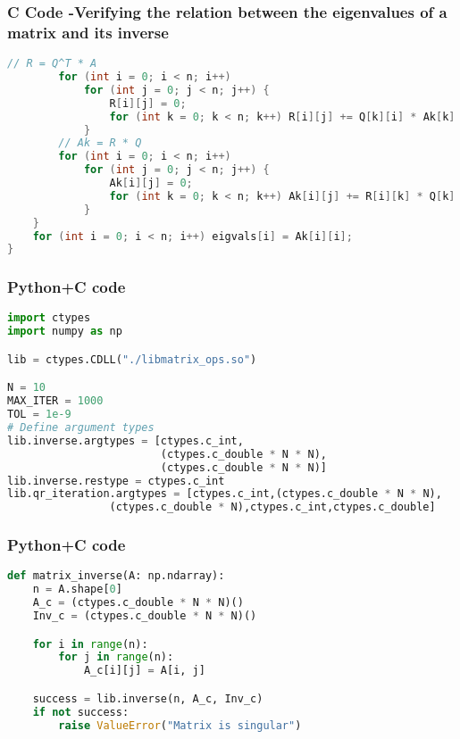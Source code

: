 \documentclass{beamer}
\begin{document}
\begin{frame}[fragile]
    \frametitle{C Code -Verifying the relation between the eigenvalues of a matrix and its inverse}

    \begin{lstlisting}[language=C]
  // R = Q^T * A
        for (int i = 0; i < n; i++)
            for (int j = 0; j < n; j++) {
                R[i][j] = 0;
                for (int k = 0; k < n; k++) R[i][j] += Q[k][i] * Ak[k][j];
            }
        // Ak = R * Q
        for (int i = 0; i < n; i++)
            for (int j = 0; j < n; j++) {
                Ak[i][j] = 0;
                for (int k = 0; k < n; k++) Ak[i][j] += R[i][k] * Q[k][j];
            }
    }
    for (int i = 0; i < n; i++) eigvals[i] = Ak[i][i];
}
    \end{lstlisting}
\end{frame}



\begin{frame}[fragile]
    \frametitle{Python+C code}

    \begin{lstlisting}[language=Python]
import ctypes
import numpy as np

lib = ctypes.CDLL("./libmatrix_ops.so")

N = 10
MAX_ITER = 1000
TOL = 1e-9
# Define argument types
lib.inverse.argtypes = [ctypes.c_int,
                        (ctypes.c_double * N * N),
                        (ctypes.c_double * N * N)]
lib.inverse.restype = ctypes.c_int
lib.qr_iteration.argtypes = [ctypes.c_int,(ctypes.c_double * N * N),
                (ctypes.c_double * N),ctypes.c_int,ctypes.c_double]
    \end{lstlisting}
\end{frame}

\begin{frame}[fragile]
    \frametitle{Python+C code}

    \begin{lstlisting}[language=Python]
def matrix_inverse(A: np.ndarray):
    n = A.shape[0]
    A_c = (ctypes.c_double * N * N)()
    Inv_c = (ctypes.c_double * N * N)()

    for i in range(n):
        for j in range(n):
            A_c[i][j] = A[i, j]

    success = lib.inverse(n, A_c, Inv_c)
    if not success:
        raise ValueError("Matrix is singular")
    \end{lstlisting}
\end{frame}
\end{document}
